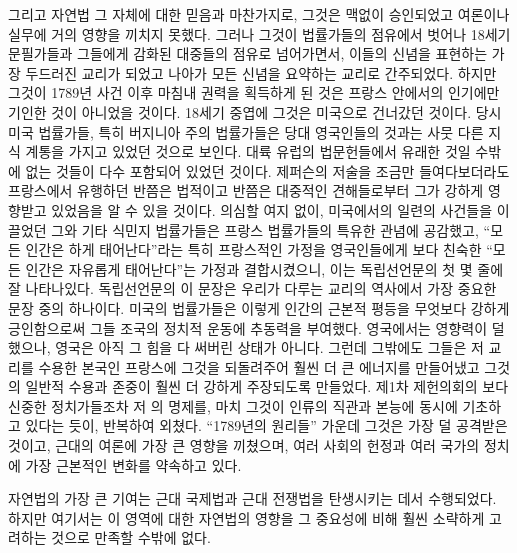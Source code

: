 그리고 자연법 그 자체에 대한 믿음과 마찬가지로,
그것은 맥없이 승인되었고 여론이나 실무에 거의 영향을 끼치지 못했다.
그러나 그것이
법률가들의 점유에서 벗어나 18세기 문필가들과
그들에게 감화된 대중들의 점유로 넘어가면서,
이들의 신념을 표현하는 가장 두드러진 교리가 되었고
나아가 모든 신념을 요약하는 교리로 간주되었다.
하지만 그것이 1789년 사건 이후 마침내 권력을 획득하게 된 것은
프랑스 안에서의 인기에만 기인한 것이 아니었을 것이다.
18세기 중엽에 그것은 미국으로 건너갔던 것이다.
당시 미국 법률가들, 특히 버지니아 주의 법률가들은
당대 영국인들의 것과는 사뭇 다른 지식 계통을 가지고 있었던 것으로 보인다.
대륙 유럽의 법문헌들에서 유래한 것일 수밖에 없는 것들이
다수 포함되어 있었던 것이다.
제퍼슨의 저술을 조금만 들여다보더라도
프랑스에서 유행하던 반쯤은 법적이고 반쯤은 대중적인 견해들로부터
그가 강하게 영향받고 있었음을 알 수 있을 것이다.
의심할 여지 없이, 미국에서의 일련의 사건들을 이끌었던
그와 기타 식민지 법률가들은
프랑스 법률가들의 특유한 관념에 공감했고,
``모든 인간은 하게 태어난다''라는 특히 프랑스적인 가정을
영국인들에게 보다 친숙한 ``모든 인간은 자유롭게 태어난다''는 가정과
결합시켰으니,
이는 독립선언문의 첫 몇 줄에 잘 나타나있다.
독립선언문의 이 문장은 우리가 다루는 교리의 역사에서
가장 중요한 문장 중의 하나이다.
미국의 법률가들은 이렇게 인간의 근본적 평등을 무엇보다 강하게 긍인함으로써
그들 조국의 정치적 운동에 추동력을 부여했다.
영국에서는 영향력이 덜 했으나, 영국은 아직
그 힘을 다 써버린 상태가 아니다.
그런데 그밖에도 그들은 저 교리를 수용한 본국인 프랑스에 그것을 되돌려주어
훨씬 더 큰 에너지를 만들어냈고 그것의 일반적 수용과 존중이 훨씬 더 강하게
주장되도록 만들었다.
제1차 제헌의회의 보다 신중한 정치가들조차
저 의 명제를,
마치 그것이 인류의 직관과 본능에 동시에 기초하고 있다는 듯이,
반복하여 외쳤다.
``1789년의 원리들'' 가운데 그것은 가장 덜 공격받은 것이고,
근대의 여론에 가장 큰 영향을 끼쳤으며,
여러 사회의 헌정과 여러 국가의 정치에 가장 근본적인 변화를
약속하고 있다.

자연법의 가장 큰 기여는 근대 국제법과 근대 전쟁법을 탄생시키는 데서 수행되었다.
하지만 여기서는 이 영역에 대한 자연법의 영향을
그 중요성에 비해 훨씬 소략하게 고려하는 것으로 만족할 수밖에 없다.

